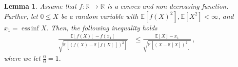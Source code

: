 \documentclass[letter, 12pt]{report}
\newcommand{\R}{\mathbb R}
\newcommand{\essinf}{\operatorname{ess\,inf}}
\newcommand{\E}{\mathbb E}
\newcommand{\1}{\mathbf{1}}
\theoremstyle{plain}
\newtheorem{lemma}[theorem]{Lemma}
\theoremstyle{definition}
\theoremstyle{remark}
\begin{document}
\begin{lemma}
    \label{lem:key-convex-ineq}
    Assume that $f: \R \to \R$ is a convex and non-decreasing function.
    Further, let $0 \leq X$ be a random variable with $\E[f(X)^2], \E[X^2] < \infty$,
    and $x_1 = \essinf X$.
    Then, the following inequality holds
    \begin{align*}
        \frac{
            \E[f(X)] - f(x_1)
        }{
            \sqrt{
                \E\left[
                    \left(f(X) - \E[f(X)]\right)^2
                    \right]
            }
        }
         & \leq
        \frac{
            \E[X] - x_1
        }{
            \sqrt{
                \E\left[
                    \left(X - \E[X]\right)^2
                    \right]
            }
        }\,,
    \end{align*}
    where we let $\tfrac{0}{0}=1$.
\end{lemma}
\end{document}
